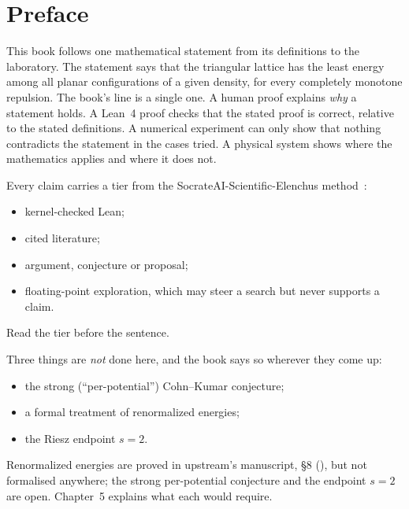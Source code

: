 \chapter*{Preface}
This book follows one mathematical statement from its definitions to the laboratory. The statement says that the
triangular lattice has the least energy among all planar configurations of a given density, for every completely
monotone repulsion. The book's line is a single one. A human proof explains \emph{why} a statement holds. A Lean~4 proof
checks that the stated proof is correct, relative to the stated definitions. A numerical experiment can only show that
nothing contradicts the statement in the cases tried. A physical system shows where the mathematics applies and where
it does not.

Every claim carries a tier from the SocrateAI-Scientific-Elenchus method~\cite{elenchus}:
\begin{itemize}
\item \tierA{} kernel-checked Lean;
\item \tierL{} cited literature;
\item \tierC{} argument, conjecture or proposal;
\item \tierX{} floating-point exploration, which may steer a search but never supports a claim.
\end{itemize}
Read the tier before the sentence.

Three things are \emph{not} done here, and the book says so wherever they come up:
\begin{itemize}
\item the strong (``per-potential'') Cohn--Kumar conjecture;
\item a formal treatment of renormalized energies;
\item the Riesz endpoint $s=2$.
\end{itemize}
Renormalized energies are proved in upstream's manuscript, \S8 (\tierL{}), but not formalised anywhere; the strong
per-potential conjecture and the endpoint $s=2$ are open. Chapter~5 explains what each would require.
